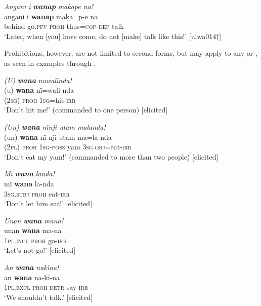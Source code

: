 \ea%
    \label{ex:syntax:103}
          \textit{Angani i} \textbf{\textit{wanap}} \textit{makape na!}\\
\gll    angani  i    \textbf{wanap}  maka=p-e    na\\
    behind  go.\textsc{pfv}  \textsc{proh}  thus=\textsc{cop-dep}  talk\\
\glt `Later, when [you] have come, do not [make] talk like this!’ [ulwa014†]
\z

Prohibitions, however, are not limited to second  forms, but may apply to any  or , as seen in examples  through .

\ea%
    \label{ex:syntax:104}
          \textit{(U)} \textbf{\textit{wana}} \textit{nuwalinda!}\\
\gll    (u)    \textbf{wana}  nï=wali-nda\\
    (\textsc{2sg)}  \textsc{proh}  \textsc{1sg=}hit-\textsc{irr}\\
\glt `Don’t hit me!’ (commanded to one person) [elicited]
\z

\ea%
    \label{ex:syntax:105}
          \textit{(Un)} \textbf{\textit{wana}} \textit{nïnji utam malanda!}\\
\gll    (un)  \textbf{wana}  nï-nji    utam  ma=la-nda\\
    (\textsc{2pl)}  \textsc{proh}  \textsc{1sg-poss}  yam  \textsc{3sg.obj=}eat-\textsc{irr}\\
\glt `Don’t eat my yam!’ (commanded to more than two people) [elicited]
\z

\ea%
    \label{ex:syntax:106}
          \textit{Mï} \textbf{\textit{wana}} \textit{landa!}\\
\gll    mï      \textbf{wana}  la-nda\\
    \textsc{3sg.subj}  \textsc{proh}  eat-\textsc{irr}\\
\glt `Don’t let him eat!’ [elicited]
\z

\ea%
    \label{ex:syntax:107}
          \textit{Unan} \textbf{\textit{wana}} \textit{mana!}\\
\gll    unan    \textbf{wana}  ma-na\\
    \textsc{1pl.incl}  \textsc{proh}  go-\textsc{irr}\\
\glt `Let’s not go!’ [elicited]
\z

\ea%
    \label{ex:syntax:108}
          \textit{An} \textbf{\textit{wana}} \textit{nakïna!}\\
\gll    an      \textbf{wana}  na-kï-na\\
    \textsc{1pl.excl}  \textsc{proh}  \textsc{detr-}say-\textsc{irr}\\
\glt `We shouldn’t talk.’ [elicited]
\z

